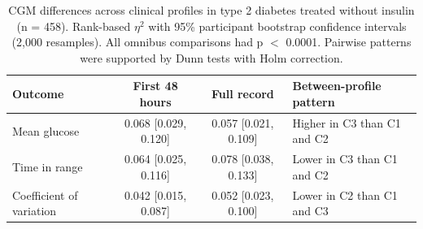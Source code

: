 \begin{table}[htbp]
\centering
\footnotesize
\caption{CGM differences across clinical profiles in type 2 diabetes treated without insulin (n = 458). Rank-based $\eta^2$ with 95\% participant bootstrap confidence intervals (2,000 resamples). All omnibus comparisons had p $<$ 0.0001. Pairwise patterns were supported by Dunn tests with Holm correction.}
\label{tab:forward}
\begin{tabular}{lccp{4.2cm}}
\toprule
Outcome & First 48 hours & Full record & Between-profile pattern \\
\midrule
Mean glucose & 0.068 [0.029, 0.120] & 0.057 [0.021, 0.109] & Higher in C3 than C1 and C2 \\
Time in range & 0.064 [0.025, 0.116] & 0.078 [0.038, 0.133] & Lower in C3 than C1 and C2 \\
Coefficient of variation & 0.042 [0.015, 0.087] & 0.052 [0.023, 0.100] & Lower in C2 than C1 and C3 \\
\bottomrule
\end{tabular}
\end{table}

